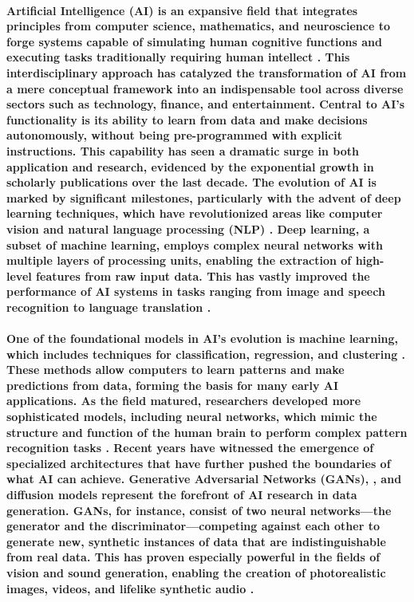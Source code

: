 \documentclass[11pt,a4paper,oneside]{report}
\begin{document}
\paragraph{Artificial Intelligence (AI) is an expansive field that integrates principles from computer science, mathematics, and neuroscience to forge systems capable of simulating human cognitive functions and executing tasks traditionally requiring human intellect \cite{russell2010artificial}. This interdisciplinary approach has catalyzed the transformation of AI from a mere conceptual framework into an indispensable tool across diverse sectors such as technology, finance, and entertainment. Central to AI's functionality is its ability to learn from data and make decisions autonomously, without being pre-programmed with explicit instructions. This capability has seen a dramatic surge in both application and research, evidenced by the exponential growth in scholarly publications over the last decade.
The evolution of AI is marked by significant milestones, particularly with the advent of deep learning techniques, which have revolutionized areas like computer vision and natural language processing (NLP) \cite{lecun2015deep}. Deep learning, a subset of machine learning, employs complex neural networks with multiple layers of processing units, enabling the extraction of high-level features from raw input data. This has vastly improved the performance of AI systems in tasks ranging from image and speech recognition to language translation \cite{goodfellow2016deep}.
}

\paragraph{One of the foundational models in AI's evolution is machine learning, which includes techniques for classification, regression, and clustering \cite{huang2022large}. These methods allow computers to learn patterns and make predictions from data, forming the basis for many early AI applications. As the field matured, researchers developed more sophisticated models, including neural networks, which mimic the structure and function of the human brain to perform complex pattern recognition tasks \cite{schmidhuber2015deep}.
Recent years have witnessed the emergence of specialized architectures that have further pushed the boundaries of what AI can achieve. Generative Adversarial Networks (GANs), \cite{goodfellow2014generative}, and diffusion models \cite{rombach2022high} represent the forefront of AI research in data generation. GANs, for instance, consist of two neural networks—the generator and the discriminator—competing against each other to generate new, synthetic instances of data that are indistinguishable from real data. This has proven especially powerful in the fields of vision and sound generation, enabling the creation of photorealistic images, videos, and lifelike synthetic audio \cite{granot2022drop}.
}
\end{document}
